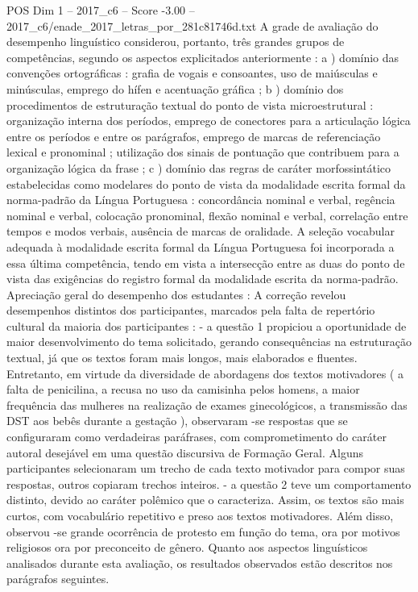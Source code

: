 \begin{textsample}{POS Dim 1 – 2017\_c6 – Score -3.00 – 2017\_c6/enade\_2017\_letras\_por\_281c81746d.txt}
A grade de avaliação do desempenho linguístico considerou, portanto, três grandes grupos de competências, segundo os aspectos explicitados anteriormente : a ) domínio das convenções ortográficas : grafia de vogais e consoantes, uso de maiúsculas e minúsculas, emprego do hífen e acentuação gráfica ; b ) domínio dos procedimentos de estruturação textual do ponto de vista microestrutural : organização interna dos períodos, emprego de conectores para a articulação lógica entre os períodos e entre os parágrafos, emprego de marcas de referenciação lexical e pronominal ; utilização dos sinais de pontuação que contribuem para a organização lógica da frase ; c ) domínio das regras de caráter morfossintático estabelecidas como modelares do ponto de vista da modalidade escrita formal da norma-padrão da Língua Portuguesa : concordância nominal e verbal, regência nominal e verbal, colocação pronominal, flexão nominal e verbal, correlação entre tempos e modos verbais, ausência de marcas de oralidade.
A seleção vocabular adequada à modalidade escrita formal da Língua Portuguesa foi incorporada a essa última competência, tendo em vista a intersecção entre as duas do ponto de vista das exigências do registro formal da modalidade escrita da norma-padrão.
Apreciação geral do desempenho dos estudantes : A correção revelou desempenhos distintos dos participantes, marcados pela falta de repertório cultural da maioria dos participantes : - a questão 1 propiciou a oportunidade de maior desenvolvimento do tema solicitado, gerando consequências na estruturação textual, já que os textos foram mais longos, mais elaborados e fluentes.
Entretanto, em virtude da diversidade de abordagens dos textos motivadores ( a falta de penicilina, a recusa no uso da camisinha pelos homens, a maior frequência das mulheres na realização de exames ginecológicos, a transmissão das DST aos bebês durante a gestação ), observaram -se respostas que se configuraram como verdadeiras paráfrases, com comprometimento do caráter autoral desejável em uma questão discursiva de Formação Geral.
Alguns participantes selecionaram um trecho de cada texto motivador para compor suas respostas, outros copiaram trechos inteiros. - a questão 2 teve um comportamento distinto, devido ao caráter polêmico que o caracteriza.
Assim, os textos são mais curtos, com vocabulário repetitivo e preso aos textos motivadores.
Além disso, observou -se grande ocorrência de protesto em função do tema, ora por motivos religiosos ora por preconceito de gênero.
Quanto aos aspectos linguísticos analisados durante esta avaliação, os resultados observados estão descritos nos parágrafos seguintes.

\end{textsample}
